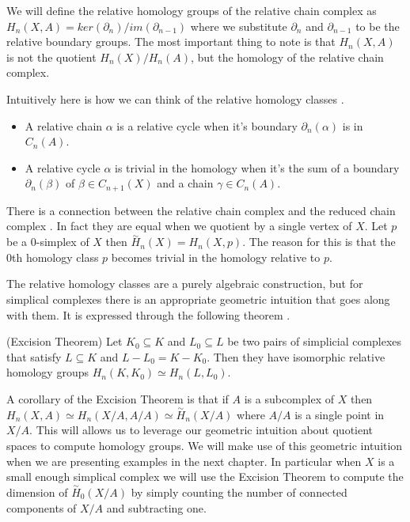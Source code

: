 We will define the relative homology groups of the relative chain complex as $H_n(X, A) = ker(\partial_n) / im(\partial_{n-1})$ where we substitute $\partial_n$ and $\partial_{n-1}$ to be the relative boundary groups. The most important thing to note is that $H_n(X, A)$ is not the quotient $H_n(X) / H_n(A)$, but the homology of the relative chain complex.

Intuitively here is how we can think of the relative homology classes \cite{algebraic-topology}.

\begin{itemize}
  \item A relative chain $\alpha$ is a relative cycle when it's boundary $\partial_n(\alpha)$ is in $C_n(A)$.
  \item A relative cycle $\alpha$ is trivial in the homology when it's the sum of a boundary $\partial_n(\beta)$ of $\beta \in C_{n+1}(X)$ and a chain $\gamma \in C_n(A)$.
\end{itemize}

There is a connection between the relative chain complex and the reduced chain complex \cite{elementary-applied-topology}. In fact they are equal when we quotient by a single vertex of $X$. Let $p$ be a 0-simplex of $X$ then $\overset{\sim}{H}_n(X) = H_n(X, p)$. The reason for this is that the 0th homology class $p$ becomes trivial in the homology relative to $p$.

The relative homology classes are a purely algebraic construction, but for simplical complexes there is an appropriate geometric intuition that goes along with them. It is expressed through the following theorem \cite{comp-topo}.

\begin{thm} (Excision Theorem)
  Let $K_0 \subseteq K$ and $L_0 \subseteq L$ be two pairs of simplicial complexes that satisfy $L \subseteq K$ and $L - L_0 = K - K_0$. Then they have isomorphic relative homology groups $H_n(K, K_0) \simeq H_n(L, L_0)$.
\end{thm}

A corollary of the Excision Theorem \cite{elementary-applied-topology} is that if $A$ is a subcomplex of $X$ then $H_n(X, A) \simeq H_n(X/A, A/A) \simeq \overset{\sim}{H}_n(X/A)$ where $A/A$ is a single point in $X/A$. This will allows us to leverage our geometric intuition about quotient spaces to compute homology groups. We will make use of this geometric intuition when we are presenting examples in the next chapter. In particular when $X$ is a small enough simplical complex we will use the Excision Theorem to compute the dimension of $\overset{\sim}{H}_0(X/A)$ by simply counting the number of connected components of $X/A$ and subtracting one.





